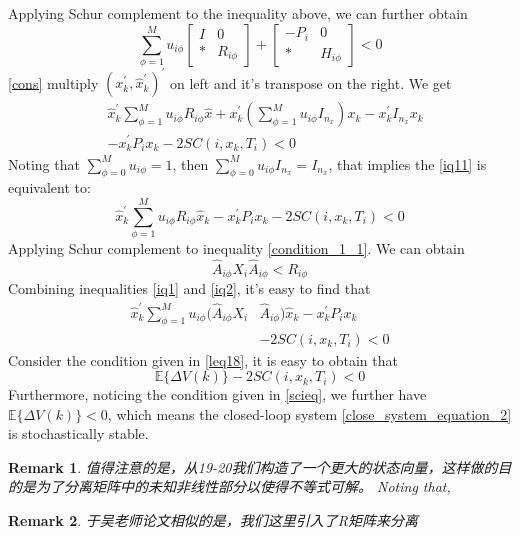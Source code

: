 \documentclass[conference]{IEEEtran}
\newtheorem{remark}{Remark}
\begin{document}
Applying Schur complement to the inequality above, we can further obtain \\
\begin{equation} \label{cons}
\sum_{\phi=1}^{M}u_{i\phi} \begin{bmatrix}
I&0\\
*&R_{i\phi}
\end{bmatrix} + \begin{bmatrix}
-P_{i }&0\\
*&H_{i\phi}
\end{bmatrix} <0
\end{equation}
\eqref{cons} multiply $(x^{'}_k,\hat{x}^{'}_{k})^{'}$ on left and it's transpose on the right. We get\\
\begin{equation} \label{iq11}
	\begin{split}
		&\hat{x}^{'}_{k}\sum_{\phi=1}^{M}u_{i\phi}R_{i\phi}\hat{x}+x^{'}_{k}(\sum_{\phi=1}^{M}u_{i\phi}I_{n_x})x_{k}-x^{'}_{k}I_{n_x}x_{k}\\
		&-x^{'}_{k}P_{i}x_{k}-2SC(i,x_k,T_i)<0
	\end{split}
\end{equation}
Noting that $\sum_{\phi=0}^{M}u_{i\phi}=1$, then $\sum_{\phi=0}^{M}u_{i\phi}I_{n_x}=I_{n_x}$, that implies the \eqref{iq11} is equivalent to:
\begin{equation} \label{iq1}
\hat{x}^{'}_{k}\sum_{\phi=1}^{M}u_{i\phi}R_{i\phi}\hat{x}_k-x^{'}_{k}P_{i}x_{k}-2SC(i,x_k,T_i)<0
\end{equation}
Applying Schur complement to inequality \eqref{condition_1_1}. We can obtain \\
\begin{equation} \label{iq2}
\hat{A}_{i\phi}X_{i}\hat{A}_{i\phi}<R_{i\phi}
\end{equation}
Combining inequalities \eqref{iq1} and \eqref{iq2}, it's easy to find that \\
\begin{equation} \label{leq22}
	\begin{split}
	\hat{x}^{'}_{k}\sum_{\phi=1}^{M} u_{i\phi}(\hat{A}_{i\phi}X_{i}&\hat{A}_{i\phi}) \hat{x}_{k} - x^{'}_{k}P_{i}x_{k}\\
	&-2SC(i,x_k,T_i)<0
	\end{split}
\end{equation}
Consider the condition given in \eqref{leq18}, it is easy to obtain that
\begin{equation}
		\mathbb{E}\{\varDelta V(k)\}-2SC(i,x_k,T_i)<0
\end{equation}
Furthermore, noticing the condition given in \eqref{scieq}, we further have $\mathbb{E}\{\varDelta V(k)\} <0$, which means the closed-loop system \eqref{close_system_equation_2} is stochastically stable.
\\
\begin{remark}
	值得注意的是，从19-20我们构造了一个更大的状态向量，这样做的目的是为了分离矩阵中的未知非线性部分以使得不等式可解。
	Noting that, 
\end{remark}
\begin{remark}
	于吴老师论文相似的是，我们这里引入了R矩阵来分离
\end{remark}
\end{document}
